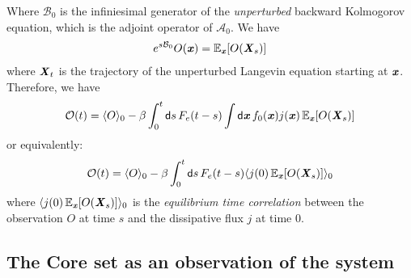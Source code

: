 \documentclass[aip,jcp,a4paper,reprint,onecolumn]{revtex4-1}
\newcommand{\vect}[1]{\textbf{\textit{#1}}}
\newcommand{\dd}{\textsf{d}}
\newcommand{\ml}{\mathcal L}
\newcommand{\fwg}{{\mathcal A}}
\newcommand{\bwg}{{\mathcal B}}
\begin{document}
Where $\bwg_0$ is the infiniesimal generator of the \emph{unperturbed} backward
Kolmogorov equation, which is the adjoint operator of $\fwg_0$.
We have
\begin{align}
  e^{s\bwg_0} O(\vect x) = \mathbb E_{\vect x} [O(\vect X_s)]
\end{align}
where $\vect X_t$ is the trajectory of the unperturbed Langevin equation
starting at $\vect x$.
Therefore, we have
\begin{align}
  \mathcal O(t)
  =
  \langle O\rangle_0
  -
  \beta
  \int_0^t\dd s\,
  F_e(t-s)
  \int \dd \vect x\,
  f_0(\vect x)
  j(\vect x)\,
  \mathbb E_{\vect x} [O(\vect X_s)]
\end{align}
or equivalently:
\begin{align}\label{eqn:lr}
  \mathcal O(t)
  =
  \langle O\rangle_0
  -
  \beta
  \int_0^t\dd s\,
  F_e(t-s)
  \langle
  j(0)\,
  \mathbb E_{\vect x} [O(\vect X_s)]
  \rangle_0
\end{align}
where $  \langle
  j(0)\,
  \mathbb E_{\vect x} [O(\vect X_s)]
  \rangle_0$ is the \emph{equilibrium time
  correlation} between the observation $O$ at time $s$ and the
dissipative flux $j$ at time 0.


\subsection{The Core set as an observation of the system}
\end{document}
